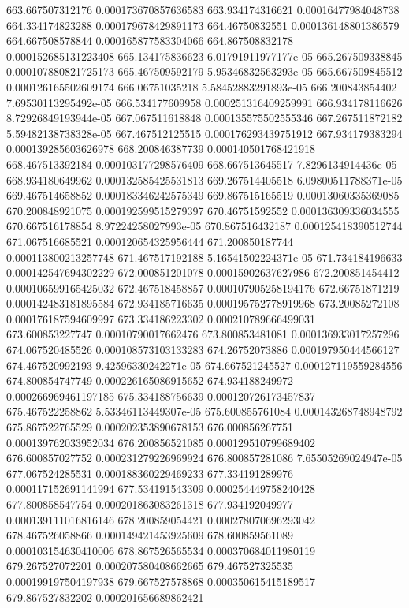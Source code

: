 {663.667507312176 0.000173670857636583
663.934174316621 0.00016477984048738
664.334174823288 0.000179678429891173
664.46750832551 0.000136148801386579
664.667508578844 0.000165877583304066
664.867508832178 0.000152685131223408
665.134175836623 6.01791911977177e-05
665.267509338845 0.000107880821725173
665.467509592179 5.95346832563293e-05
665.667509845512 0.000126165502609174
666.06751035218 5.58452883291893e-05
666.200843854402 7.69530113295492e-05
666.534177609958 0.000251316409259991
666.934178116626 8.72926849193944e-05
667.067511618848 0.000135575502555346
667.267511872182 5.59482138738328e-05
667.467512125515 0.000176293439751912
667.934179383294 0.000139285603626978
668.200846387739 0.000140501768421918
668.467513392184 0.000103177298576409
668.667513645517 7.8296134914436e-05
668.934180649962 0.000132585425531813
669.267514405518 6.09800511788371e-05
669.467514658852 0.000183346242575349
669.867515165519 0.00013060335369085
670.200848921075 0.000192599515279397
670.46751592552 0.000136309336034555
670.667516178854 8.97224258027993e-05
670.867516432187 0.000125418390512744
671.067516685521 0.000120654325956444
671.200850187744 0.000113800213257748
671.467517192188 5.16541502224371e-05
671.734184196633 0.000142547694302229
672.000851201078 0.00015902637627986
672.200851454412 0.000106599165425032
672.467518458857 0.000107905258194176
672.66751871219 0.000142483181895584
672.934185716635 0.000195752778919968
673.20085272108 0.000176187594609997
673.334186223302 0.000210789666499031
673.600853227747 0.00010790017662476
673.800853481081 0.000136933017257296
674.067520485526 0.000108573103133283
674.26752073886 0.000197950444566127
674.467520992193 9.42596330242271e-05
674.667521245527 0.000127119559284556
674.800854747749 0.000226165086915652
674.934188249972 0.000266969461197185
675.334188756639 0.000120726173457837
675.467522258862 5.53346113449307e-05
675.600855761084 0.000143268748948792
675.867522765529 0.000202353890678153
676.000856267751 0.000139762033952034
676.200856521085 0.000129510799689402
676.600857027752 0.000231279226969924
676.800857281086 7.65505269024947e-05
677.067524285531 0.000188360229469233
677.334191289976 0.000117152691141994
677.534191543309 0.000254449758240428
677.800858547754 0.000201863083261318
677.934192049977 0.000139111016816146
678.200859054421 0.000278070696293042
678.467526058866 0.000149421453925609
678.600859561089 0.000103154630410006
678.867526565534 0.000370684011980119
679.267527072201 0.000207580408662665
679.467527325535 0.000199197504197938
679.667527578868 0.000350615415189517
679.867527832202 0.000201656689862421
}
